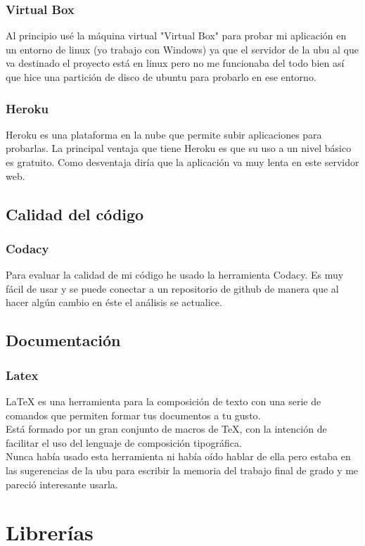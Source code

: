 \subsubsection{Virtual Box}
Al principio usé la máquina virtual "Virtual Box" para probar mi aplicación en un entorno de linux (yo trabajo con Windows) ya que el servidor de la ubu al que va destinado el proyecto está en linux pero no me funcionaba del todo bien así que hice una partición de disco de ubuntu para probarlo en ese entorno. 
\subsubsection{Heroku}
Heroku es una plataforma en la nube que permite subir aplicaciones para probarlas. La principal ventaja que tiene Heroku es que su uso a un nivel básico es gratuito. Como desventaja diría que la aplicación va muy lenta en este servidor web.
\subsection{Calidad del código}
\subsubsection{Codacy}
Para evaluar la calidad de mi código he usado la herramienta Codacy. Es muy fácil de usar y se puede conectar a un repositorio de github de manera que al hacer algún cambio en éste el análisis se actualice.\\
\subsection{Documentación}
\subsubsection{Latex}
\LaTeX{} es una herramienta para la composición de texto con una serie de comandos que permiten formar tus documentos a tu gusto.\\
Está formado por un gran conjunto de macros de TeX, con la intención de facilitar el uso del lenguaje de composición tipográfica.\cite{wiki:latex}\\
Nunca había usado esta herramienta ni había oído hablar de ella pero estaba en las sugerencias de la ubu para escribir la memoria del trabajo final de grado y me pareció interesante usarla. 
\section{Librerías}
